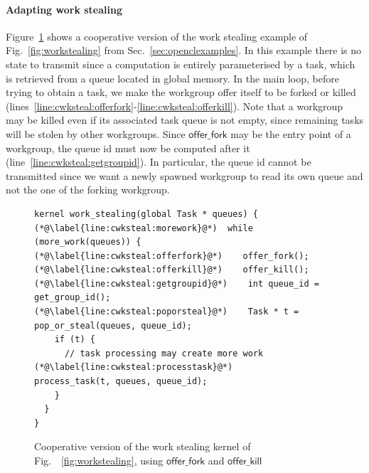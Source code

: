 \documentclass[numbers,nocopyrightspace,10pt]{sigplanconf}
\newcommand{\myfig}{Fig.~}
\newcommand{\myfiglong}{Figure~}
\newcommand{\mysec}{Sec.~}
\newcommand{\offerfork}{\mathsf{offer\_fork}}
\newcommand{\offerkill}{\mathsf{offer\_kill}}
\begin{document}
\paragraph{Adapting work stealing}

\myfiglong\ref{fig:workstealing-cooperative} shows a cooperative
version of the work stealing example of \myfig\ref{fig:workstealing} from \mysec\ref{sec:openclexamples}.
%
In this example there is no state to transmit since a computation is
entirely parameterised by a task, which is retrieved from a queue
located in global memory. In the main loop, before trying to obtain a
task, we make the workgroup offer itself to be forked or killed
(lines~\ref{line:cwksteal:offerfork}-\ref{line:cwksteal:offerkill}). Note
that a workgroup may be killed even if its associated task queue is
not empty, since remaining tasks will be stolen by other
workgroups. Since $\offerfork$ may be the entry point of a workgroup,
the queue id must now be computed after it (line~\ref{line:cwksteal:getgroupid}). In particular, the queue
id cannot be transmitted since we want a newly spawned workgroup to
read its own queue and not the one of the forking workgroup.


\begin{figure}

\begin{lstlisting}
kernel work_stealing(global Task * queues) {
(*@\label{line:cwksteal:morework}@*)  while (more_work(queues)) {
(*@\label{line:cwksteal:offerfork}@*)    offer_fork();
(*@\label{line:cwksteal:offerkill}@*)    offer_kill();
(*@\label{line:cwksteal:getgroupid}@*)    int queue_id = get_group_id();
(*@\label{line:cwksteal:poporsteal}@*)    Task * t = pop_or_steal(queues, queue_id);
    if (t) {
      // task processing may create more work
(*@\label{line:cwksteal:processtask}@*)      process_task(t, queues, queue_id);
    }
  }
}
\end{lstlisting}

\caption{Cooperative version of the work stealing kernel of
  \myfig~\ref{fig:workstealing}, using $\offerfork$ and
  $\offerkill$}\label{fig:workstealing-cooperative}
\end{figure}
\end{document}
